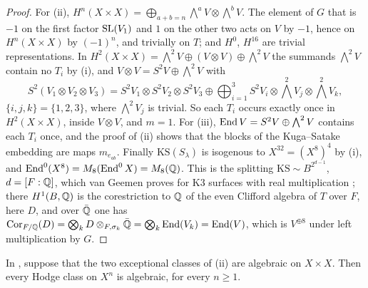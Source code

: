 \begin{proof}
For (ii),
$H^{n}(X\times X)=\bigoplus_{a+b=n}\bigwedge^{a}V\otimes\bigwedge^{b}V$. The
element of $G$ that is $-1$ on the first factor $\operatorname{SL}(V_{1})$ and $1$ on the
other two acts on $V$ by $-1$, hence on $H^{n}(X\times X)$ by $(-1)^{n}$, and
trivially on $T$; and $H^{0}$, $H^{16}$ are trivial representations. In
$H^{2}(X\times X)=\bigwedge^{2}V\oplus(V\otimes V)\oplus\bigwedge^{2}V$ the
summands $\bigwedge^{2}V$ contain no $T_{i}$ by (i), and
$V\otimes V=S^{2}V\oplus\bigwedge^{2}V$ with
\[
  S^{2}(V_{1}\otimes V_{2}\otimes V_{3})
  =S^{2}V_{1}\otimes S^{2}V_{2}\otimes S^{2}V_{3}
  \oplus\bigoplus_{i=1}^{3}S^{2}V_{i}\otimes
  \textstyle\bigwedge^{2}V_{j}\otimes\bigwedge^{2}V_{k},
\]
$\{i,j,k\}=\{1,2,3\}$, where $\bigwedge^{2}V_{j}$ is trivial. So each $T_{i}$
occurs exactly once in $H^{2}(X\times X)$, inside $V\otimes V$, and $m=1$.
For (iii), $\operatorname{End} V=S^{2}V\oplus
\bigwedge^{2}V$ contains each $T_{i}$ once, and the proof of
(ii) shows that the blocks of the Kuga--Satake embedding
are maps $m_{e_{ab}}$. Finally $\mathrm{KS}(S_{\lambda})$ is isogenous to
$X^{32}=(X^{8})^{4}$ by (i), and
$\operatorname{End}^{0}(X^{8})=M_{8}(\operatorname{End}^{0}X)=M_{8}(\mathbb{Q})$. This is the splitting
$\mathrm{KS}\sim B^{2^{d-1}}$, $d=[F:\mathbb{Q}]$, which van Geemen proves for K3
surfaces with real multiplication \cite{vG08}; there $H^{1}(B,\mathbb{Q})$ is the
corestriction to $\mathbb{Q}$ of the even Clifford algebra of $T$ over $F$, here
$D$, and over $\bar{\mathbb{Q}}$ one has $\operatorname{Cor}_{F/\mathbb{Q}}(D)=
\bigotimes_{k}D\otimes_{F,\sigma_{k}}\bar{\mathbb{Q}}=\bigotimes_{k}\operatorname{End}(V_{k})=
\operatorname{End}(V)$, which is $V^{\oplus8}$ under left multiplication by $G$.
\end{proof}

\begin{theorem}\label{thm:mumfordpowers}
In , suppose that the two exceptional classes of
(ii) are algebraic on $X\times X$. Then every Hodge
class on $X^{n}$ is algebraic, for every $n\ge1$.
\end{theorem}

